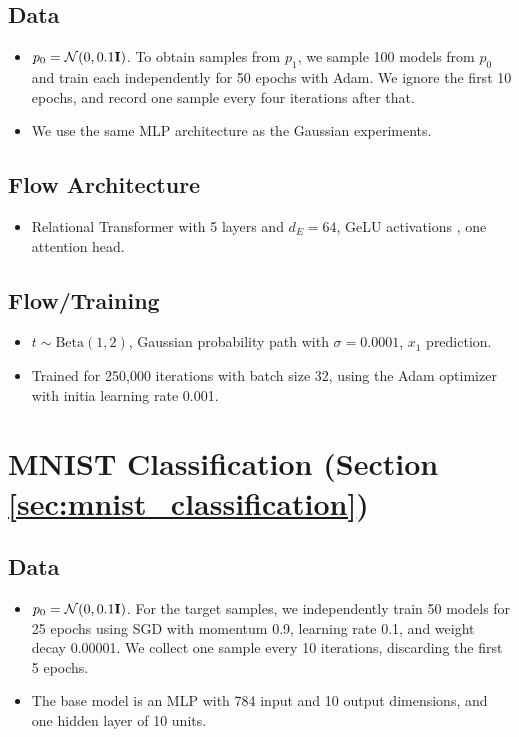 \subsection*{Data}

\begin{itemize}
    \item $p_0 = \mathcal{N}(0, 0.1 \mathbf{I})$. To obtain samples from $p_1$, we sample 100 models from $p_0$ and train each independently for 50 epochs with Adam. We ignore the first 10 epochs, and record one sample every four iterations after that. 
    \item We use the same MLP architecture as the Gaussian experiments. 
\end{itemize}

\subsection*{Flow Architecture}
\begin{itemize}
    \item Relational Transformer \citep{diaoRelationalAttentionGeneralizing2023,kofinasGraphNeuralNetworks2024} with 5 layers and $d_E = 64$, GeLU activations \citep{hendrycksGaussianErrorLinear2023a}, one attention head. 
\end{itemize}

\subsection*{Flow/Training}
\begin{itemize}
    \item $t \sim \text{Beta}(1, 2)$, Gaussian probability path with $\sigma = 0.0001$, $x_1$ prediction.
    \item Trained for 250,000 iterations with batch size 32, using the Adam optimizer with initia learning rate 0.001.
\end{itemize}


\section*{MNIST Classification (Section \ref{sec:mnist_classification})}

\subsection*{Data}

\begin{itemize}
    \item $p_0 = \mathcal{N}(0, 0.1 \mathbf{I})$. For the target samples, we independently train 50 models for 25 epochs using SGD with momentum 0.9, learning rate 0.1, and weight decay 0.00001. We collect one sample every 10 iterations, discarding the first 5 epochs. 
    \item The base model is an MLP with 784 input and 10 output dimensions, and one hidden layer of 10 units. 
\end{itemize}

